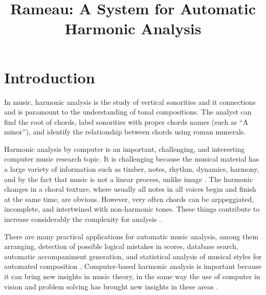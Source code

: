 \documentclass{article}
\title{Rameau: A System for Automatic Harmonic Analysis}
\begin{document}
\maketitle

\begin{abstract}

\end{abstract}

\section{Introduction}
\label{sec:introduction}

In music, harmonic analysis is the study of vertical sonorities and it
connections and is paramount to the understanding of tonal
compositions. The analyst can find the root of chords, label
sonorities with proper chords names (such as ``A minor''), and
identify the relationship between chords using roman numerals.

Harmonic analysis by computer is an important, challenging, and
interesting computer music research topic. It is challenging because
the musical material has a large variety of information such as
timber, notes, rhythm, dynamics, harmony, and by the fact that music is
not a linear process, unlike image \cite{mouton95:numeric}. The
harmonic changes in a choral texture, where usually all notes in all
voices begin and finish at the same time, are obvious. However, very
often chords can be arppeggiated, incomplete, and intertwined with
non-harmonic tones. These things contribute to increase considerably
the complexity for analysis \cite{pardo00:automated}. 

There are many practical applications for automatic music analysis,
among them arranging, detection of possible logical mistakes in
scores, database search, automatic accompaniment generation, and
statistical analysis of musical styles for automated composition
\cite{pardo02:algorithms,temperley99:modeling}. Computer-based
harmonic analysis is important because it can bring new insights in
music theory, in the same way the use of computer in vision and
problem solving has brought new insights in these areas
\cite{temperley99:modeling}.
\end{document}
